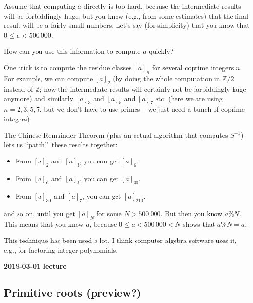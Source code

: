 \documentclass[numbers=enddot,12pt,final,onecolumn,notitlepage]{scrartcl}%
\numberwithin{exer}{subsection}
\theoremstyle{definition}
\begin{document}
Assume that computing $a$ directly is too hard, because the intermediate
results will be forbiddingly huge, but you know (e.g., from some estimates)
that the final result will be a fairly small numbers. Let's say (for
simplicity) that you know that $0\leq a<500\ 000$.

How can you use this information to compute $a$ quickly?

One trick is to compute the residue classes $\left[  a\right]  _{n}$ for
several coprime integers $n$. For example, we can compute $\left[  a\right]
_{2}$ (by doing the whole computation in $\mathbb{Z}/2$ instead of
$\mathbb{Z}$; now the intermediate results will certainly not be forbiddingly
huge anymore) and similarly $\left[  a\right]  _{3}$ and $\left[  a\right]
_{5}$ and $\left[  a\right]  _{7}$ etc. (here we are using $n=2,3,5,7$, but we
don't have to use primes -- we just need a bunch of coprime integers).

The Chinese Remainder Theorem (plus an actual algorithm that computes $S^{-1}%
$) lets us \textquotedblleft patch\textquotedblright\ these results together:

\begin{itemize}
\item From $\left[  a\right]  _{2}$ and $\left[  a\right]  _{3}$, you can get
$\left[  a\right]  _{6}$.

\item From $\left[  a\right]  _{6}$ and $\left[  a\right]  _{5}$, you can get
$\left[  a\right]  _{30}$.

\item From $\left[  a\right]  _{30}$ and $\left[  a\right]  _{7}$, you can get
$\left[  a\right]  _{210}$.
\end{itemize}

and so on, until you get $\left[  a\right]  _{N}$ for some $N>500\ 000$. But
then you know $a\%N$. This means that you know $a$, because $0\leq
a<500\ 000<N$ shows that $a\%N=a$.

This technique has been used a lot. I think computer algebra software uses it,
e.g., for factoring integer polynomials.

\begin{center}
\textbf{2019-03-01 lecture}
\end{center}

\subsection{Primitive roots (preview?)}
\end{document}
